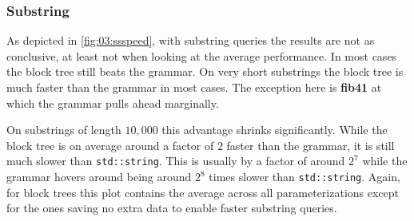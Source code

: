 \documentclass{scrartcl}
\begin{document}
\subsubsection{Substring}

As depicted in \cref{fig:03:ssspeed}, with substring queries the results are not as conclusive, at least not when looking at the average performance.
In most cases the block tree still beats the grammar.
On very short substrings the block tree is much faster than the grammar in most cases.
The exception here is \textbf{fib41} at which the grammar pulls ahead marginally.

On substrings of length $10,000$ this advantage shrinks significantly.
While the block tree is on average around a factor of $2$ faster than the grammar,
it is still much slower than \texttt{std::string}.
This is usually by a factor of around $2^7$ while the grammar hovers around being around $2^8$
times slower than \texttt{std::string}.
Again, for block trees this plot contains the average across all parameterizations except for the ones saving no extra data to enable faster substring queries.
\end{document}
